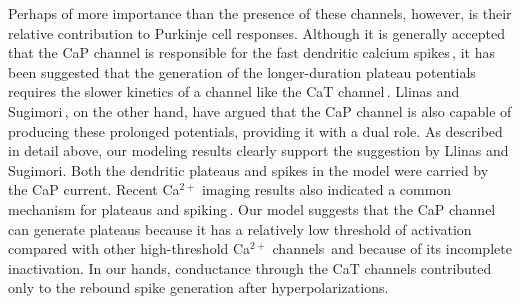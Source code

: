 \documentclass[12pt]{article}
\begin{document}
Perhaps of more importance than the presence of these
channels, however, is their relative contribution to Purkinje
cell responses. Although it is generally accepted that the
CaP channel is responsible for the fast dendritic calcium
spikes\,\cite{R:1980ly}, it has been suggested that the
generation of the longer-duration plateau potentials requires
the slower kinetics of a channel like the CaT channel\,\cite{Fortier:1991fk}. 
Llinas and Sugimori\,\cite{Llinas:1992rq}, on the
other hand, have argued that the CaP channel is also capable
of producing these prolonged potentials, providing it
with a dual role. As described in detail above, our modeling
results clearly support the suggestion by Llinas and Sugimori.
Both the dendritic plateaus and spikes in the model
were carried by the CaP current. Recent Ca$^{2+}$ imaging results
also indicated a common mechanism for plateaus and
spiking\,\cite{Lev-Ram:1992vn}. Our model suggests that the
CaP channel can generate plateaus because it has a relatively
low threshold of activation\,\cite{Regan:1991ly, Usowicz:1992bh} 
compared with other high-threshold Ca$^{2+}$ channels\,\cite{Fox:1987zr} 
and because of its incomplete inactivation.
In our hands, conductance through the CaT channels
contributed only to the rebound spike generation after
hyperpolarizations.



\end{document}
